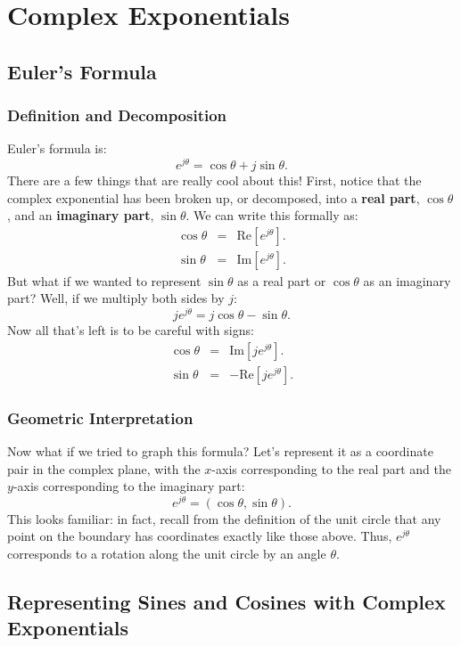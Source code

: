 \documentclass[11pt]{article}
\begin{document}
\section{Complex Exponentials}

\subsection{Euler's Formula}

\subsubsection{Definition and Decomposition}
Euler's formula is:
\[\boxed{ e^{j\theta} = \cos{\theta} + j\sin{\theta}. }\]
There are a few things that are really cool about this! First, notice that the complex exponential has been broken up, or decomposed, into a {\bf real part}, $\cos{\theta}$, and an {\bf imaginary part}, $\sin{\theta}$. We can write this formally as:
\begin{eqnarray*}
\cos{\theta} &=& \mbox{Re}[e^{j\theta}]. \\
\sin{\theta} &=& \mbox{Im}[e^{j\theta}].
\end{eqnarray*}
But what if we wanted to represent $\sin{\theta}$ as a real part or $\cos{\theta}$ as an imaginary part? Well, if we multiply both sides by $j$:
\[je^{j\theta} = j\cos{\theta} - \sin{\theta}.\]
Now all that's left is to be careful with signs:
\begin{eqnarray*}
\cos{\theta} &=& \mbox{Im}[je^{j\theta}] . \\
\sin{\theta} &=& -\mbox{Re}[je^{j\theta}].
\end{eqnarray*}

\subsubsection{Geometric Interpretation}

Now what if we tried to graph this formula? Let's represent it as a coordinate pair in the complex plane, with the $x$-axis corresponding to the real part and the $y$-axis corresponding to the imaginary part:
\[e^{j\theta} = (\cos{\theta},\sin{\theta}).\]
This looks familiar: in fact, recall from the definition of the unit circle that any point on the boundary has coordinates exactly like those above. Thus, $e^{j\theta}$ corresponds to a rotation along the unit circle by an angle $\theta$.

\subsection{Representing Sines and Cosines with Complex Exponentials}
\end{document}
